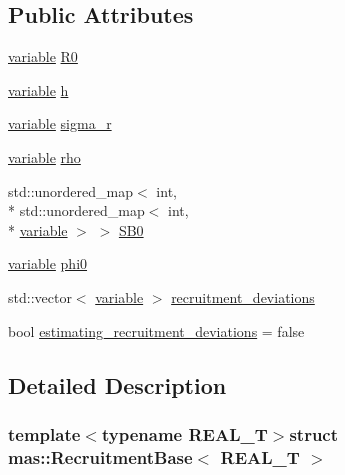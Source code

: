 \subsection*{Public Attributes}
\begin{DoxyCompactItemize}
\item 
\hyperlink{structmas_1_1_recruitment_base_acc579cce5a745bcbb31758b3420c960b}{variable} \hyperlink{structmas_1_1_recruitment_base_a4f99fb299e8f00f36645ffb032592e04}{R0}
\item 
\hyperlink{structmas_1_1_recruitment_base_acc579cce5a745bcbb31758b3420c960b}{variable} \hyperlink{structmas_1_1_recruitment_base_ac460098ea97bddb9f1a41bb854d8f89d}{h}
\item 
\hyperlink{structmas_1_1_recruitment_base_acc579cce5a745bcbb31758b3420c960b}{variable} \hyperlink{structmas_1_1_recruitment_base_a17d973c0bbb663b2d836c9f5b1270b9b}{sigma\-\_\-r}
\item 
\hyperlink{structmas_1_1_recruitment_base_acc579cce5a745bcbb31758b3420c960b}{variable} \hyperlink{structmas_1_1_recruitment_base_a85904d0c8996b9903609f6f9a93d20bc}{rho}
\item 
std\-::unordered\-\_\-map$<$ int, \\*
std\-::unordered\-\_\-map$<$ int, \\*
\hyperlink{structmas_1_1_recruitment_base_acc579cce5a745bcbb31758b3420c960b}{variable} $>$ $>$ \hyperlink{structmas_1_1_recruitment_base_ab682c3efec8a1c9ffe3481f193ef6d64}{S\-B0}
\item 
\hyperlink{structmas_1_1_recruitment_base_acc579cce5a745bcbb31758b3420c960b}{variable} \hyperlink{structmas_1_1_recruitment_base_a4e6c20c02bc08e1ca5f3489992fd8c2f}{phi0}
\item 
std\-::vector$<$ \hyperlink{structmas_1_1_recruitment_base_acc579cce5a745bcbb31758b3420c960b}{variable} $>$ \hyperlink{structmas_1_1_recruitment_base_acab1229c5bea140584480dee25e28414}{recruitment\-\_\-deviations}
\item 
bool \hyperlink{structmas_1_1_recruitment_base_a84eb1f6997fa59d983ba24a1d2d36f5e}{estimating\-\_\-recruitment\-\_\-deviations} = false
\end{DoxyCompactItemize}


\subsection{Detailed Description}
\subsubsection*{template$<$typename R\-E\-A\-L\-\_\-\-T$>$struct mas\-::\-Recruitment\-Base$<$ R\-E\-A\-L\-\_\-\-T $>$}




